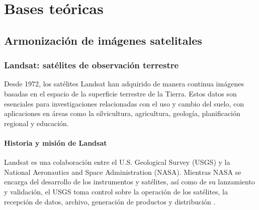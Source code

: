     \section{Bases teóricas}
        \subsection{Armonización de imágenes satelitales}
            \subsubsection{Landsat: satélites de observación terrestre}
                Desde 1972, los satélites Landsat han adquirido de manera continua imágenes basadas en el espacio de la superficie terrestre de la Tierra. Estos datos son esenciales para investigaciones relacionadas con el uso y cambio del suelo, con aplicaciones en áreas como la silvicultura, agricultura, geología, planificación regional y educación.
                
                \paragraph{Historia y misión de Landsat}
                    Landsat es una colaboración entre el U.S. Geological Survey (USGS) y la National Aeronautics and Space Administration (NASA). Mientras NASA se encarga del desarrollo de los instrumentos y satélites, así como de su lanzamiento y validación, el USGS toma control sobre la operación de los satélites, la recepción de datos, archivo, generación de productos y distribución \autocite{USGS2023}.
                    


